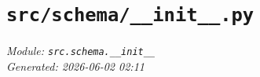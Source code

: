 
\section{\texttt{src/schema/\_\_init\_\_.py}}
\textit{Module: \texttt{src.schema.\_\_init\_\_}} \\
\textit{Generated: 2026-06-02 02:11} \\
